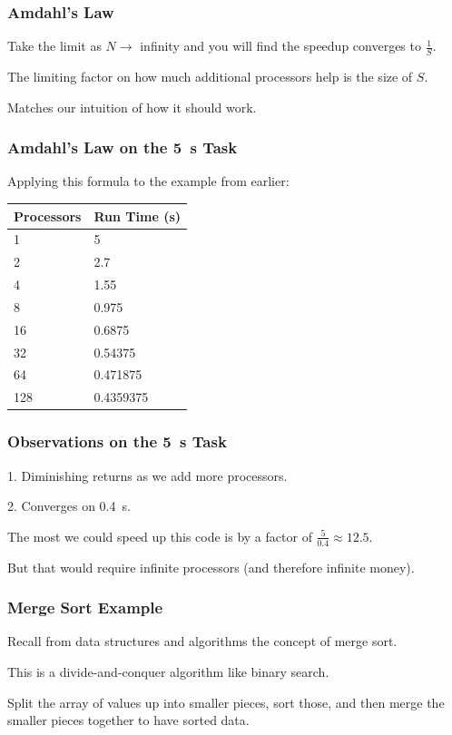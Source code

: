  
\begin{frame}
\frametitle{Amdahl's Law}

Take the limit as $N \rightarrow$ infinity and you will find the speedup converges to $\frac{1}{S}$.


The limiting factor on how much additional processors help is the size of $S$.

Matches our intuition of how it should work.

\end{frame}

 
\begin{frame}
\frametitle{Amdahl's Law on the 5~s Task}

Applying this formula to the example from earlier:

\begin{center}
	\begin{tabular}{l|l}
	\textbf{Processors} & \textbf{Run Time (s)} \\ \hline
	1 & 5\\
	2 & 2.7\\
	4 & 1.55\\
	8 & 0.975\\
	16 & 0.6875 \\
	32 & 0.54375 \\
	64 & 0.471875 \\
	128 & 0.4359375\\
	\end{tabular}
\end{center}

\end{frame}

 
\begin{frame}
\frametitle{Observations on the 5~s Task}

1. Diminishing returns as we add more processors.

2. Converges on 0.4~s.

The most we could speed up this code is by a factor of $\frac{5}{0.4}\approx 12.5$.

But that would require infinite processors (and therefore infinite money).

\end{frame}

 
\begin{frame}
\frametitle{Merge Sort Example}

Recall from data structures and algorithms the concept of merge sort. 

This is a divide-and-conquer algorithm like binary search. 

Split the array of values up into smaller pieces, sort those, and then merge the smaller pieces together to have sorted data.


\end{frame}

